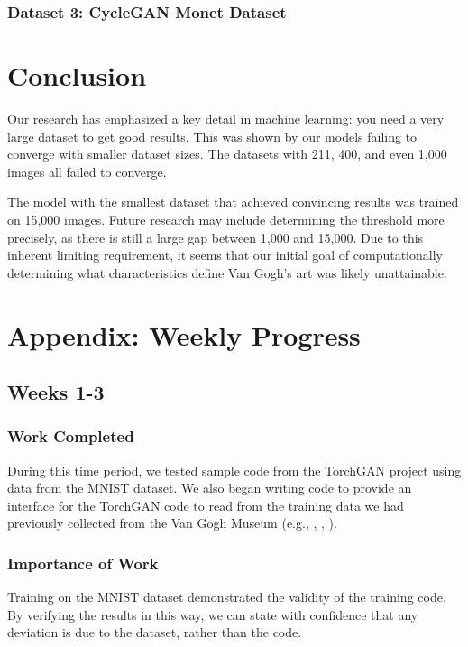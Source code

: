 \documentclass[11pt,letterpaper]{article}
\begin{document}
			\subsubsection{Dataset 3: CycleGAN Monet Dataset}



	\section{Conclusion}
		Our research has emphasized a key detail in machine learning: you need a very large dataset to get good results.
		This was shown by our models failing to converge with smaller dataset sizes.
		The datasets with 211, 400, and even 1,000 images all failed to converge.


		The model with the smallest dataset that achieved convincing results was trained on 15,000 images.
		Future research may include determining the threshold more precisely, as there is still a large gap between 1,000 and 15,000.
		Due to this inherent limiting requirement, it seems that our initial goal of computationally determining what characteristics define Van Gogh's art was likely unattainable.

\appendix
	\section{Appendix: Weekly Progress}
		\subsection{Weeks 1-3}
		\label{subsec:weekly:1-3}
			\subsubsection{Work Completed}
				During this time period, we tested sample code from the TorchGAN\cite{pal2019torchgan} project using data from the MNIST\cite{lecun2010mnist} dataset.
				We also began writing code to provide an interface for the TorchGAN code to read from the training data we had previously collected from the Van Gogh Museum (e.g., \cite{001}, \cite{002}, \cite{003}).
			\subsubsection{Importance of Work}
				Training on the MNIST dataset demonstrated the validity of the training code.
				By verifying the results in this way, we can state with confidence that any deviation is due to the dataset, rather than the code.
\end{document}
